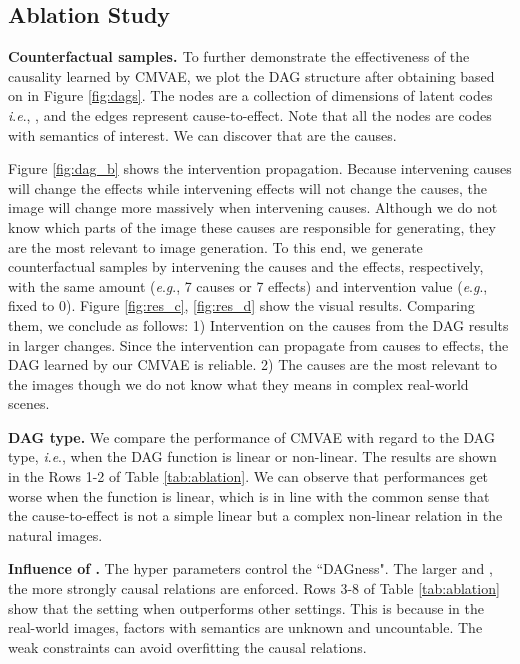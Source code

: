 \documentclass[letterpaper]{article} \usepackage{aaai23}  \usepackage{times}  \usepackage{helvet}  \usepackage{courier}  \usepackage[hyphens]{url}  \usepackage{graphicx} \urlstyle{rm} \def\UrlFont{\rm}  \usepackage{natbib}  \usepackage{caption} \frenchspacing  \setlength{\pdfpagewidth}{8.5in}  \setlength{\pdfpageheight}{11in}  \usepackage{algorithm}
\newcommand{\ie}{\textit{i}.\textit{e}.}
\newcommand{\eg}{\textit{e}.\textit{g}.}
\theoremstyle{plain}
\theoremstyle{definition}
\theoremstyle{remark}
\begin{document}
\subsection{Ablation Study}


\noindent\textbf{Counterfactual samples. \label{sec:count}} 
To further demonstrate the effectiveness of the causality learned by CMVAE, we plot the DAG structure after obtaining  based on  in Figure \ref{fig:dags}. The nodes are a collection of dimensions of latent codes \ie,  , and the edges represent cause-to-effect. Note that all the nodes are codes with semantics of interest. We can  discover that  are the causes.

Figure \ref{fig:dag_b} shows the intervention propagation. Because intervening causes will change the effects while intervening effects will not change the causes, the image will change more massively when intervening causes.  Although we do not know which parts of the image these causes are responsible for generating, they are the most relevant to image generation. To this end, we generate counterfactual samples by intervening the causes and the effects, respectively, with the same amount (\eg, 7 causes or 7 effects) and intervention value (\eg, fixed to 0). Figure \ref{fig:res_c}, \ref{fig:res_d} show the visual results. Comparing them, we conclude as follows: 1) Intervention on the causes from the DAG results in larger changes. Since the intervention can propagate from causes to effects, the DAG learned by our CMVAE is reliable. 2) The causes are the most relevant to the images though we do not know what they means in complex real-world scenes.  


\noindent\textbf{DAG type.} We compare the performance of CMVAE with regard to the DAG type, \ie, when the DAG function  is linear or non-linear. The results are shown in the Rows 1-2 of Table \ref{tab:ablation}. We can observe that performances get worse when the function  is linear, which is in line with the common sense that the cause-to-effect is not a simple linear but a complex non-linear relation in the natural images. 

\noindent \textbf{Influence of .} The hyper parameters  control the ``DAGness". The larger  and , the more strongly causal relations are enforced. Rows 3-8 of Table \ref{tab:ablation} show that the setting when  outperforms other settings. This is because in the real-world images, factors with semantics are unknown and uncountable. The weak constraints  can avoid overfitting the causal relations. 
\end{document}
